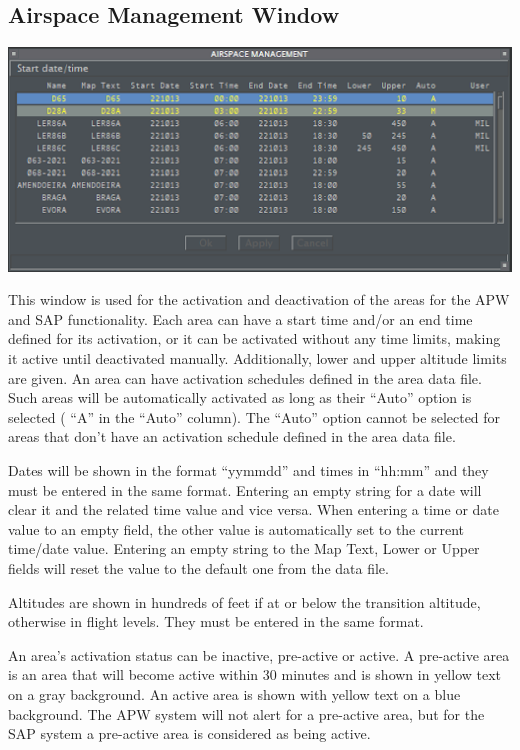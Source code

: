 \documentclass[11pt,a4paper,oldfontcommands]{memoir}
\begin{document}
\subsection{Airspace Management Window}
\label{menu:tsa}
\includegraphics{img/tsa.png}

This window is used for the activation and deactivation of the areas for the APW and SAP functionality. Each area can have a start time and/or an end time defined for its activation, or it can be activated without any time limits, making it active until deactivated manually. Additionally, lower and upper altitude limits are given. An area can have activation schedules defined in the area data file. Such areas will be automatically activated as long as their “Auto” option is selected ( “A” in the “Auto” column). The “Auto” option cannot be selected for areas that don’t have an activation schedule defined in the area data file.

Dates will be shown in the format “yymmdd” and times in “hh:mm” and they must be entered in the same format. Entering an empty string for a date will clear it and the related time value and vice versa. When entering a time or date value to an empty field, the other value is automatically set to the current time/date value. Entering an empty string to the Map Text, Lower or Upper fields will reset the value to the default one from the data file.

Altitudes are shown in hundreds of feet if at or below the transition altitude, otherwise in flight levels. They must be entered in the same format.

An area’s activation status can be inactive, pre-active or active. A pre-active area is an area that will become active within 30 minutes and is shown in yellow text on a gray background. An active area is shown with yellow text on a blue background. The APW system will not alert for a pre-active area, but for the SAP system a pre-active area is considered as being active.
\end{document}
